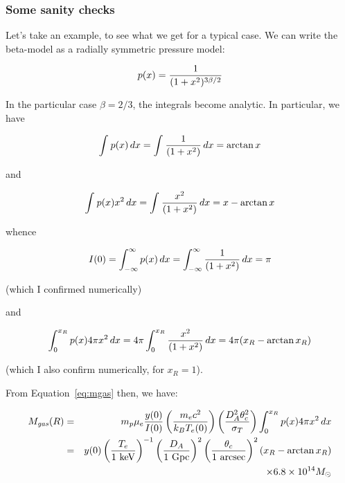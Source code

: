\subsubsection{Some sanity checks}

Let's take an example, to see what we get for a typical case.  We can write the beta-model as a radially symmetric pressure model:

\begin{equation}
p(x) = {1\over{(1 + x^2)^{3\beta/2}}}
\end{equation}

In the particular case $\beta = 2/3$, the integrals become analytic.  In particular, we have

\begin{equation}
\int^{}_{}{p(x)\,dx} = \int^{}_{}{{1\over{(1 + x^2)}}\,dx} = \arctan{x}
\end{equation}

and 

\begin{equation}
\int^{}_{}{p(x)x^2\,dx} = \int^{}_{}{{x^2\over{(1 + x^2)}}\,dx} = {x - \arctan{x}}
\end{equation}

whence

\begin{equation}
I(0) = \int^{\infty}_{-\infty}{p(x)\,dx} = \int^{\infty}_{-\infty}{{1\over{(1 + x^2)}}\,dx} = \pi
\end{equation}

(which I confirmed numerically)

and 

\begin{equation}
\int^{x_R}_{0}{p(x)4\pi x^2\,dx} = 4\pi\int^{x_R}_{0}{{x^2\over{(1 + x^2)}}\,dx} = 4\pi ({x_R - \arctan{x_R}})
\end{equation}

(which I also confirm numerically, for $x_R = 1$).

From Equation~\ref{eq:mgas} then, we have:

\begin{eqnarray}
M_{\it gas}(R) &=& m_p\mu_e {{y(0)}\over{I(0)}} \left({{m_e c^2}\over{k_B T_e(0)}}\right)\left({{D^2_A\theta^2_c}\over{\sigma_T}}\right)\int^{x_R}_{0}{p(x)4\pi x^2\,dx}\\\nonumber
     &=& y(0)\left({{T_e}\over{1~{\rm keV}}}\right)^{-1} \left({{D_A}\over{1~{\rm Gpc}}}\right)^2 \left({{\theta_c}\over{1~{\rm arcsec}}}\right)^2 ({x_R - \arctan{x_R}})\\\nonumber
&& \times 6.8\times 10^{14}M_{\odot}
\end{eqnarray}

